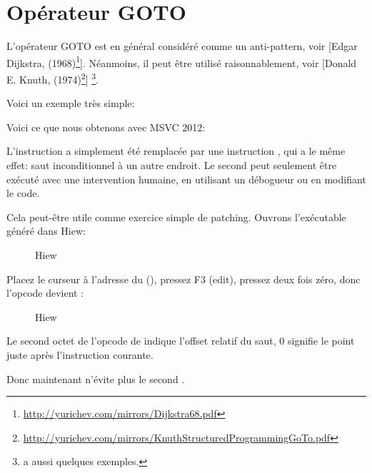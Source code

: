 \section{Opérateur GOTO}

L'opérateur GOTO est en général considéré comme un anti-pattern, voir
[Edgar Dijkstra,  (1968)\footnote{\url{http://yurichev.com/mirrors/Dijkstra68.pdf}}].
Néanmoins, il peut être utilisé raisonnablement, voir
[Donald E. Knuth,  (1974)\footnote{\url{http://yurichev.com/mirrors/KnuthStructuredProgrammingGoTo.pdf}}]
\footnote{\InSqBrackets{\CNotes} a aussi quelques exemples.}.

Voici un exemple très simple:



Voici ce que nous obtenons avec MSVC 2012:



L'instruction  a simplement été remplacée par une instruction \JMP, qui
a le même effet: saut inconditionnel à un autre endroit.
Le second \printf peut seulement être exécuté avec une intervention humaine, en
utilisant un débogueur ou en modifiant le code.

\par

\clearpage

Cela peut-être utile comme exercice simple de patching. Ouvrons l'exécutable généré
dans Hiew:

\begin{figure}[H]
\centering
{}
\caption{Hiew}
\label{fig:goto_hiew1}
\end{figure}

\clearpage
Placez le curseur à l'adresse du \JMP (),
pressez F3 (edit), pressez deux fois zéro, donc l'opcode devient :

\begin{figure}[H]
\centering
{}
\caption{Hiew}
\label{fig:goto_hiew2}
\end{figure}

Le second octet de l'opcode de \JMP indique l'offset relatif du saut, 0 signifie
le point juste après l'instruction courante.

Donc maintenant \JMP n'évite plus le second \printf.

